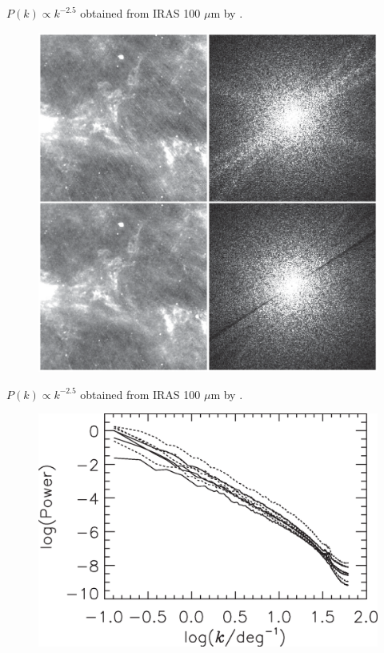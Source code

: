 \documentclass[12pt]{article}
\begin{document}
                \clearpage
        \begin{small}
        $P(k)\propto k^{-2.5}$ obtained from IRAS 100 $\mu$m by \cite{1998ApJ...500..525S}.
        \end{small}
            \begin{figure}[hb]
              \centering
              \includegraphics[totalheight=80 mm]{img/Schlege1998_fft.eps}
            \end{figure}   
        \clearpage
        \begin{small}
        $P(k)\propto k^{-2.5}$ obtained from IRAS 100 $\mu$m by \cite{1998ApJ...500..525S}.
        \end{small}
            \begin{figure}[hb]
              \centering
              \includegraphics[totalheight=80 mm]{img/Schlege1998_power.eps}
            \end{figure} 
\end{document}
